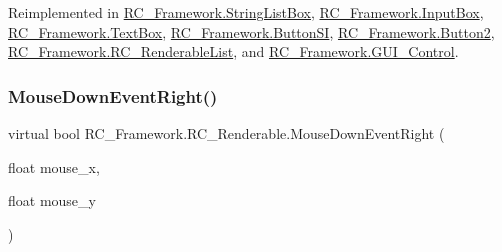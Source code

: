 Reimplemented in \mbox{\hyperlink{class_r_c___framework_1_1_string_list_box_aabe8c72a90d47c67eb162c76b1e7f79c}{R\+C\+\_\+\+Framework.\+String\+List\+Box}}, \mbox{\hyperlink{class_r_c___framework_1_1_input_box_a7e57c860483df9645d726d6adbbc6dab}{R\+C\+\_\+\+Framework.\+Input\+Box}}, \mbox{\hyperlink{class_r_c___framework_1_1_text_box_a73f9a94392ff9bf3639a37a29470fb63}{R\+C\+\_\+\+Framework.\+Text\+Box}}, \mbox{\hyperlink{class_r_c___framework_1_1_button_s_i_a4323f8436749655b240fa35caa15daa6}{R\+C\+\_\+\+Framework.\+Button\+SI}}, \mbox{\hyperlink{class_r_c___framework_1_1_button2_ac15728fbc9e908a70990c159ecd5824f}{R\+C\+\_\+\+Framework.\+Button2}}, \mbox{\hyperlink{class_r_c___framework_1_1_r_c___renderable_list_adce00726f7093db725ed6195292156a7}{R\+C\+\_\+\+Framework.\+R\+C\+\_\+\+Renderable\+List}}, and \mbox{\hyperlink{class_r_c___framework_1_1_g_u_i___control_a005e7f109afd21abd6576fdf70212af5}{R\+C\+\_\+\+Framework.\+G\+U\+I\+\_\+\+Control}}.

\mbox{\label{class_r_c___framework_1_1_r_c___renderable_a827d6c2bde928d9337b341f2ff60ac48}} 
\subsubsection{\texorpdfstring{Mouse\+Down\+Event\+Right()}{MouseDownEventRight()}}
{\footnotesize\ttfamily virtual bool R\+C\+\_\+\+Framework.\+R\+C\+\_\+\+Renderable.\+Mouse\+Down\+Event\+Right (\begin{DoxyParamCaption}\item[{float}]{mouse\+\_\+x,  }\item[{float}]{mouse\+\_\+y }\end{DoxyParamCaption})\hspace{0.3cm}{\ttfamily [virtual]}}

\mbox{\label{class_r_c___framework_1_1_r_c___renderable_a64771aae3018662ed596c01ee36fb87f}} 
